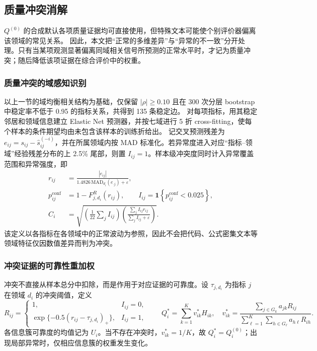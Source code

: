 \documentclass[bwprint]{gmcmthesis}
\begin{document}
\subsection{质量冲突消解}
\label{subsec:q1_conflict}

$Q^{(0)}$ 的合成默认各项质量证据均可直接使用，但特殊文本可能使个别评价器偏离该领域的常见关系。
因此，本文把“正常的多维差异”与“异常的不一致”分开处理。只有当某项观测显著偏离同域相关信号所预测的正常水平时，才记为质量冲突；随后降低该项证据在综合评价中的权重。

\subsubsection{质量冲突的域感知识别}

以上一节的域均衡相关结构为基础，仅保留 $|\rho|\ge0.10$ 且在 300 次分层 bootstrap 中稳定率不低于 0.95 的指标关系，共得到 135 条稳定边。
对每项指标，用其稳定邻居和领域信息建立 Elastic Net 预测器，并按七域进行 5 折 cross-fitting，使每个样本的条件期望均由未包含该样本的训练折给出。
记交叉预测残差为 $e_{ij}=s_{ij}-\widehat s_{ij}^{(-i)}$，并在所属领域内按 MAD 标准化。若异常度进入对应“指标--领域”经验残差分布的上 2.5\% 尾部，则置 $I_{ij}=1$。样本级冲突度同时计入异常覆盖范围和异常强度，即
\begin{equation}
\begin{aligned}
r_{ij}&=\frac{|e_{ij}|}{1.4826\,\mathrm{MAD}_{d_i}(e_{\cdot j})+\varepsilon},\\
p_{ij}^{\mathrm{conf}}&=1-F_{j,d_i}^{R}(r_{ij}),\qquad
I_{ij}=\mathbf{1}\!\left\{p_{ij}^{\mathrm{conf}}<0.025\right\},\\
C_i&=\sqrt{\left(\frac{1}{22}\sum_j I_{ij}\right)
\left(\frac{\sum_j I_{ij}r_{ij}}{\sum_j I_{ij}+\varepsilon}\right)}.
\end{aligned}
\label{eq:q1_conflict}
\end{equation}
该定义以各指标在各领域中的正常波动为参照，因此不会把代码、公式密集文本等领域特征仅因数值差异而判为冲突。

\subsubsection{冲突证据的可靠性重加权}

冲突不直接从样本总分中扣除，而是作用于对应证据的可靠度。设 $\tau_{j,d_i}$ 为指标 $j$ 在领域 $d_i$ 的冲突阈值，定义
\begin{equation}
R_{ij}=\begin{cases}
1, & I_{ij}=0,\\
\exp\{-0.5(r_{ij}-\tau_{j,d_i})_+\}, & I_{ij}=1,
\end{cases}
\qquad
Q_i^*=\sum_{k=1}^{K}v_{ik}^*H_{ik},\quad
v_{ik}^*=\frac{\sum_{j\in G_k}a_{jk}R_{ij}}
{\sum_{\ell=1}^{K}\sum_{h\in G_\ell}a_{h\ell}R_{ih}}.
\label{eq:q1_qstar}
\end{equation}
各信息簇可靠度的均值记为 $U_i$。当不存在冲突时，$v_{ik}^*=1/K$，故 $Q_i^*=Q_i^{(0)}$；出现局部异常时，仅相应信息簇的权重发生变化。
\end{document}
